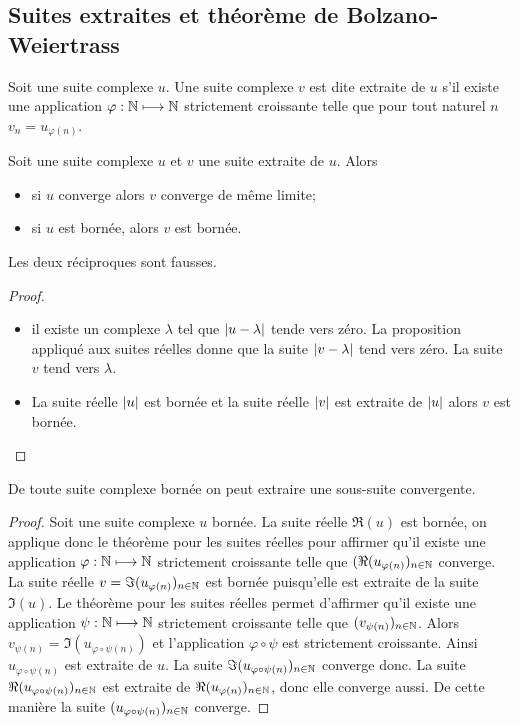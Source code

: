 \subsection{Suites extraites et théorème de Bolzano-Weiertrass}
\begin{defdef}
    Soit une suite complexe \(u\). Une suite complexe \(v\) est dite
    extraite de \(u\) s'il existe une application \(\varphi:\mathbb{N} \longmapsto
    \mathbb{N}\) strictement croissante telle que pour tout naturel \(n\) \(v_n =
    u_{\varphi(n)}\).
\end{defdef}
\begin{prop}
    Soit une suite complexe \(u\) et \(v\) une suite extraite de \(u\).
    Alors
    \begin{itemize}
        \item si \(u\) converge alors \(v\) converge de même limite;
        \item si \(u\) est bornée, alors \(v\) est bornée.
    \end{itemize}
    Les deux réciproques sont fausses.
\end{prop}
\begin{proof}
    \begin{itemize}
        \item il existe un complexe \(\lambda\) tel que \(\left\lvert u-\lambda\right\rvert\)
            tende vers zéro. La proposition appliqué aux suites réelles donne
            que la suite \(\left\lvert v-\lambda\right\rvert\) tend vers zéro. La suite \(v\)
            tend vers \(\lambda\).
        \item La suite réelle \(\left\lvert u\right\rvert\) est bornée et la suite réelle
            \(\left\lvert v\right\rvert\) est extraite de \(\left\lvert u\right\rvert\) alors \(v\) est bornée.
    \end{itemize}
\end{proof}
\begin{theo}
    De toute suite complexe bornée on peut extraire une sous-suite
    convergente.
\end{theo}
\begin{proof}
    Soit une suite complexe \(u\) bornée. La suite réelle \(\Re(u)\) est
    bornée, on applique donc le théorème pour les suites réelles pour
    affirmer qu'il existe une application \(\varphi:\mathbb{N} \longmapsto \mathbb{N}\)
    strictement croissante telle que \((\Re(u_{\varphi(n)})_{n \in \mathbb{N}}\)
    converge. La suite réelle \(v = \Im(u_{\varphi(n)})_{n \in \mathbb{N}}\) est
    bornée puisqu'elle est extraite de la suite \(\Im(u)\). Le théorème
    pour les suites réelles permet d'affirmer qu'il existe une application
    \(\psi:\mathbb{N} \longmapsto \mathbb{N}\) strictement croissante telle que
    \((v_{\psi(n)})_{n \in \mathbb{N}}\). Alors \(v_{\psi(n)} = \Im(u_{\varphi
    \circ \psi(n)})\) et l'application \(\varphi \circ \psi\) est
    strictement croissante. Ainsi \(u_{\varphi \circ \psi(n)}\) est
    extraite de \(u\). La suite \(\Im(u_{\varphi \circ \psi(n)})_{n \in
    \mathbb{N}}\) converge donc. La suite \(\Re(u_{\varphi \circ \psi(n)})_{n \in
    \mathbb{N}}\) est extraite de \(\Re(u_{\varphi(n)})_{n \in \mathbb{N}}\), donc elle
    converge aussi. De cette manière la suite \((u_{\varphi \circ
    \psi(n)})_{n \in \mathbb{N}}\) converge.
\end{proof}

